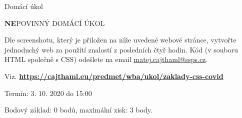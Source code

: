 \documentclass[aspectratio=1610]{beamer}
\begin{document}
\begin{frame}{Domácí úkol}
    \begin{cardTiny}
        \begin{center}
            \textbf{NE}POVINNÝ DOMÁCÍ ÚKOL
        \end{center}
        \begin{flushleft}
            Dle screenshotu, který je přiložen na níže uvedené webové stránce, vytvořte jednoduchý web za použítí znalostí z posledních čtyř hodin. Kód (v souboru HTML společně s CSS) odešlete na email \href{mailto:matej.cajthaml@ssps.cz}{matej.cajthaml@ssps.cz}. 

            \vspace{2ex}
            Viz. \textbf{\href{https://cajthaml.eu/predmet/wba/ukol/zaklady-css-covid}{https://cajthaml.eu/predmet/wba/ukol/zaklady-css-covid}}

            Termín: 3. 10. 2020 do 15:00

            \vspace{2ex}
            Bodový základ: 0 bodů, maximální zisk: 3 body.
        \end{flushleft}
    \end{cardTiny}
\end{frame}
\end{document}

